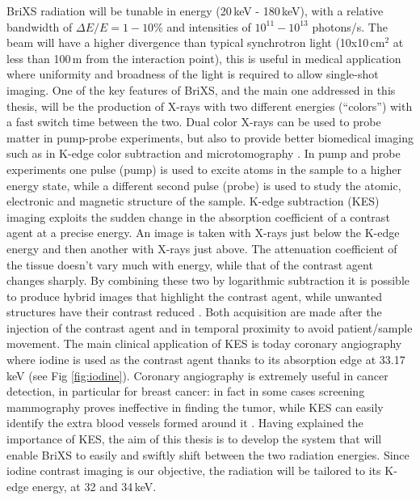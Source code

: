 BriXS radiation will be tunable in energy (20\,keV - 180\,keV), with a relative bandwidth of $\Delta E/E = 1-10\%$ and intensities  of $10^{11}-10^{13}$ photons/s. The beam will have a higher divergence than typical synchrotron light (10x10\,cm$^{2}$ at less than 100\,m from the interaction point), this is useful in medical application where uniformity and broadness of the light is required to allow single-shot imaging.
One of the key features of BriXS, and the main one addressed in this thesis, will be the production of X-rays with two different energies (``colors'') with a fast switch time between the two. Dual color X-rays can be used to probe matter in pump-probe experiments, but also to provide better biomedical imaging such as in K-edge color subtraction and microtomography \parencite{Jacobson1953}.
In pump and probe experiments one pulse (pump) is used to excite atoms in the sample to a higher energy state, while a different second pulse (probe) is used to study the atomic, electronic and magnetic structure of the sample.
K-edge subtraction (KES) imaging exploits the sudden change in the absorption coefficient of a contrast agent at a precise energy. An image is taken with X-rays just below the K-edge energy and then another with X-rays just above. The attenuation coefficient of the tissue doesn't vary much with energy, while that of the contrast agent changes sharply. By combining these two by logarithmic subtraction it is possible to produce hybrid images that highlight the contrast agent, while unwanted structures have their contrast reduced \parencite{Lehmann1981}. Both acquisition are made after the injection of the contrast agent and in temporal proximity to avoid patient/sample movement. The main clinical application of KES is today coronary angiography where iodine is used as the contrast agent thanks to its absorption edge at 33.17\,keV (see Fig \ref{fig:iodine}). Coronary angiography is extremely useful in cancer detection, in particular for breast cancer: in fact in some cases screening mammography proves ineffective in finding the tumor, while KES can easily identify the extra blood vessels formed around it \parencite{Lewin2003}. Having explained the importance of KES, the aim of this thesis is to develop the system that will enable BriXS to easily and swiftly shift between the two radiation energies. Since iodine contrast imaging is our objective, the radiation will be tailored to its K-edge energy, at 32 and 34\,keV.
